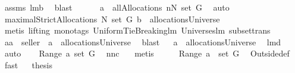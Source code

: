 \begin{isabellebody}
\isamarkupfalse%
\ assms\ lm{}{}b\ \isamarkupfalse%
\ blast\isanewline
{}\isamarkupfalse%
\ \isamarkupfalse%
\ \isamarkupfalse%
\ \isanewline
{}{\isacharcolon}\ {\isachardoublequoteopen}a\ {\isasymin}\ allAllocations\ {\isacharparenleft}{\isacharbraceleft}{\isacharquery}n{\isacharbraceright}{\isasymunion}N{\isacharparenright}\ {\isacharparenleft}set\ G{\isacharparenright}{\isachardoublequoteclose}\ \isamarkupfalse%
\ auto\isanewline
{}\isamarkupfalse%
\ \isamarkupfalse%
\ {\isachardoublequoteopen}maximalStrictAllocations{\isacharprime}\ N\ {\isacharparenleft}set\ G{\isacharparenright}\ b\ {\isasymsubseteq}\ allocationsUniverse{\isachardoublequoteclose}\ \isanewline
{}\isamarkupfalse%
\ {\isacharparenleft}metis\ {\isacharparenleft}lifting{\isacharcomma}\ mono{\isacharunderscore}tags{\isacharparenright}\ UniformTieBreaking{\isachardot}lm{}{}\ Universes{\isachardot}lm{}{}\ subset{\isacharunderscore}trans{\isacharparenright}\isanewline
{}\isamarkupfalse%
\ \isamarkupfalse%
\ \isamarkupfalse%
\ {\isachardoublequoteopen}{\isacharquery}a{\isacharequal}a\ {\isacharminus}{\isacharminus}\ seller\ {\isacharampersand}\ a\ {\isasymin}\ allocationsUniverse{\isachardoublequoteclose}\ \isamarkupfalse%
\ blast\isanewline
{}\isamarkupfalse%
\ \isamarkupfalse%
\ {\isachardoublequoteopen}{\isacharquery}a\ {\isasymin}\ allocationsUniverse{\isachardoublequoteclose}\ \isamarkupfalse%
\ lm{}{}d\ \isamarkupfalse%
\ auto\isanewline
{}\isamarkupfalse%
\ \isamarkupfalse%
\ {\isachardoublequoteopen}{\isasymUnion}\ Range\ a{\isacharequal}\ set\ G{\isachardoublequoteclose}\ \isamarkupfalse%
\ nn{}{}c\ {}\ \isamarkupfalse%
\ metis\isanewline
{}\isamarkupfalse%
\ \isamarkupfalse%
\ \isamarkupfalse%
\ {\isachardoublequoteopen}{\isasymUnion}\ Range\ {\isacharquery}a\ {\isasymsubseteq}\ set\ G{\isachardoublequoteclose}\ \isamarkupfalse%
\ Outside{\isacharunderscore}def\ {}\ \isamarkupfalse%
\ fast\isanewline
{}\isamarkupfalse%
\ \isamarkupfalse%
\ {\isacharquery}thesis\ \isamarkupfalse%

\end{isabellebody}
